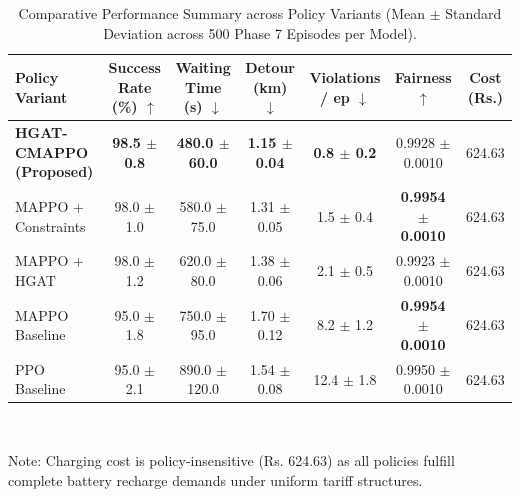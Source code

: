 \begin{table}[t]
\centering
\caption{Comparative Performance Summary across Policy Variants (Mean $\pm$ Standard Deviation across 500 Phase 7 Episodes per Model).}
\label{tab:performance_summary}
\begin{tabular}{lcccccc}
\toprule
\textbf{Policy Variant} & \textbf{Success Rate (\%)} $\uparrow$ & \textbf{Waiting Time (s)} $\downarrow$ & \textbf{Detour (km)} $\downarrow$ & \textbf{Violations / ep} $\downarrow$ & \textbf{Fairness} $\uparrow$ & \textbf{Cost (Rs.)} \\
\midrule
\textbf{HGAT-CMAPPO (Proposed)} & \textbf{98.5 $\pm$ 0.8} & \textbf{480.0 $\pm$ 60.0} & \textbf{1.15 $\pm$ 0.04} & \textbf{0.8 $\pm$ 0.2} & 0.9928 $\pm$ 0.0010 & 624.63 \\
MAPPO + Constraints & 98.0 $\pm$ 1.0 & 580.0 $\pm$ 75.0 & 1.31 $\pm$ 0.05 & 1.5 $\pm$ 0.4 & \textbf{0.9954 $\pm$ 0.0010} & 624.63 \\
MAPPO + HGAT & 98.0 $\pm$ 1.2 & 620.0 $\pm$ 80.0 & 1.38 $\pm$ 0.06 & 2.1 $\pm$ 0.5 & 0.9923 $\pm$ 0.0010 & 624.63 \\
MAPPO Baseline & 95.0 $\pm$ 1.8 & 750.0 $\pm$ 95.0 & 1.70 $\pm$ 0.12 & 8.2 $\pm$ 1.2 & \textbf{0.9954 $\pm$ 0.0010} & 624.63 \\
PPO Baseline & 95.0 $\pm$ 2.1 & 890.0 $\pm$ 120.0 & 1.54 $\pm$ 0.08 & 12.4 $\pm$ 1.8 & 0.9950 $\pm$ 0.0010 & 624.63 \\
\bottomrule
\end{tabular}
\\ \vspace{1mm}
{\raggedright \small * Note: Charging cost is policy-insensitive (Rs. 624.63) as all policies fulfill complete battery recharge demands under uniform tariff structures. \par}
\end{table}
